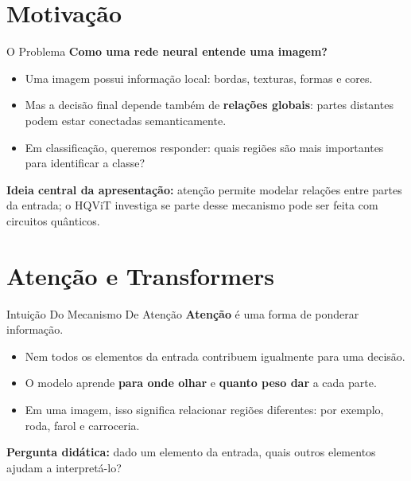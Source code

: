 \section{Motivação}

\begin{frame}{O Problema}
    \textbf{Como uma rede neural entende uma imagem?}
    \begin{itemize}
        \item Uma imagem possui informação local: bordas, texturas, formas e cores.
        \item Mas a decisão final depende também de \textbf{relações globais}: partes distantes podem estar conectadas semanticamente.
        \item Em classificação, queremos responder: quais regiões são mais importantes para identificar a classe?
    \end{itemize}
    \vspace{0.4em}
    \textbf{Ideia central da apresentação:} atenção permite modelar relações entre partes da entrada; o HQViT investiga se parte desse mecanismo pode ser feita com circuitos quânticos.
\end{frame}


\section{Atenção e Transformers}

\begin{frame}{Intuição Do Mecanismo De Atenção}
    \textbf{Atenção} é uma forma de ponderar informação.
    \begin{itemize}
        \item Nem todos os elementos da entrada contribuem igualmente para uma decisão.
        \item O modelo aprende \textbf{para onde olhar} e \textbf{quanto peso dar} a cada parte.
        \item Em uma imagem, isso significa relacionar regiões diferentes: por exemplo, roda, farol e carroceria.
    \end{itemize}
    \vspace{0.4em}
    \textbf{Pergunta didática:} dado um elemento da entrada, quais outros elementos ajudam a interpretá-lo?
\end{frame}

